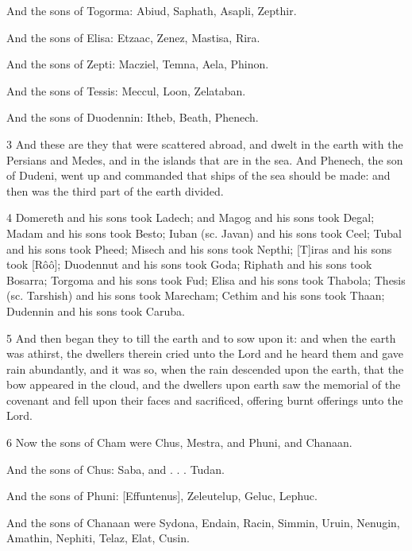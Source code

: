 \par And the sons of Togorma: Abiud, Saphath, Asapli, Zepthir.

\par And the sons of Elisa: Etzaac, Zenez, Mastisa, Rira.

\par And the sons of Zepti: Macziel, Temna, Aela, Phinon.

\par And the sons of Tessis: Meccul, Loon, Zelataban.

\par And the sons of Duodennin: Itheb, Beath, Phenech.

\par 3 And these are they that were scattered abroad, and dwelt in the earth with the Persians and Medes, and in the islands that are in the sea. And Phenech, the son of Dudeni, went up and commanded that ships of the sea should be made: and then was the third part of the earth divided.

\par 4 Domereth and his sons took Ladech; and Magog and his sons took Degal; Madam and his sons took Besto; Iuban (sc. Javan) and his sons took Ceel; Tubal and his sons took Pheed; Misech and his sons took Nepthi; [T]iras and his sons took [Rôô]; Duodennut and his sons took Goda; Riphath and his sons took Bosarra; Torgoma and his sons took Fud; Elisa and his sons took Thabola; Thesis (sc. Tarshish) and his sons took Marecham; Cethim and his sons took Thaan; Dudennin and his sons took Caruba.

\par 5 And then began they to till the earth and to sow upon it: and when the earth was athirst, the dwellers therein cried unto the Lord and he heard them and gave rain abundantly, and it was so, when the rain descended upon the earth, that the bow appeared in the cloud, and the dwellers upon earth saw the memorial of the covenant and fell upon their faces and sacrificed, offering burnt offerings unto the Lord.

\par 6 Now the sons of Cham were Chus, Mestra, and Phuni, and Chanaan.

\par And the sons of Chus: Saba, and . . . Tudan.

\par And the sons of Phuni: [Effuntenus], Zeleutelup, Geluc, Lephuc.

\par And the sons of Chanaan were Sydona, Endain, Racin, Simmin, Uruin, Nenugin, Amathin, Nephiti, Telaz, Elat, Cusin.


